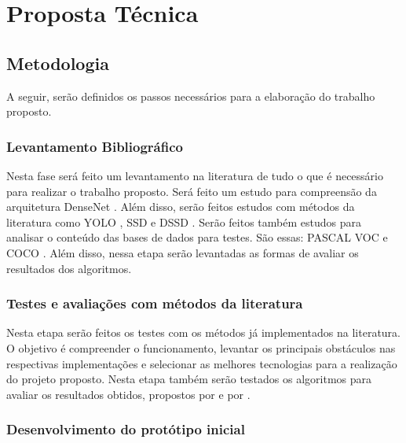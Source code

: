 \chapter{Proposta Técnica}
\label{cap:4}
\vspace{-1.9cm}


\section{Metodologia}
\label{secao:4:1}

A seguir, serão definidos os passos necessários para a elaboração do trabalho proposto.

\subsection{Levantamento Bibliográfico}
\label{subsecao:4:1:1}

Nesta fase será feito um levantamento na literatura de tudo o que é necessário para realizar o trabalho proposto. Será feito um estudo para compreensão da arquitetura \ac{DenseNet} \cite{liu-2017}. Além disso, serão feitos estudos com métodos da literatura como \ac{YOLO} \cite{redmon-2015}, \ac{SSD} \cite{wei-2015} e \ac{DSSD} \cite{cheng-2017}. Serão feitos também estudos para analisar o conteúdo das bases de dados para testes. São essas: \ac{PASCAL VOC} \cite{everingham-2015} e \ac{COCO} \cite{lin-2014}. Além disso, nessa etapa serão levantadas as formas de avaliar os resultados dos algoritmos.

\subsection{Testes e avaliações com métodos da literatura}
\label{subsecao:4:1:2}

Nesta etapa serão feitos os testes com os métodos já implementados na literatura. O objetivo é compreender o funcionamento, levantar os principais obstáculos nas respectivas implementações e selecionar as melhores tecnologias para a realização do projeto proposto. Nesta etapa também serão testados os algoritmos para avaliar os resultados obtidos, propostos por  e por .

\subsection{Desenvolvimento do protótipo inicial}
\label{subsecao:4:1:3}

